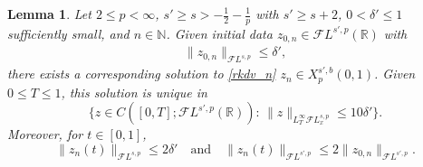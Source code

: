 \documentclass[a4paper,
11pt,  reqno]{amsart}
\newcommand{\5}{\textup{V}}
\newcommand{\FL}{\mathcal{F} L}
\newcommand{\dl}{\delta}
\newtheorem{lemma}[theorem]{Lemma}
\theoremstyle{remark}
\newcommand{\R}{\mathbb{R}}
\newcommand{\N}{\mathbb{N}}
\numberwithin{equation}{section}
\numberwithin{theorem}{section}
\begin{document}
\begin{lemma}\label{lem:zn}
Let $2 \le p < \infty$, $s' \ge s > -\frac12 - \frac1p$ with $s' \ge s+2$,  $0<\dl' \le 1$ sufficiently small, and $n\in\N$.
Given initial data $z_{0,n} \in \FL^{s',p}(\R)$ with
\begin{align}\label{z0n}
\| z_{0,n} \|_{\FL^{s, p}} \le  \dl',
\end{align}
there exists a corresponding solution to \eqref{rkdv_n} $z_n \in X^{s', b}_p(0,1)$. Given $0\le T \le 1$, this solution is unique in
$$
\big\{z\in C([0,T];\FL^{s',p}(\R)): \,  \|z\|_{L^\infty_T \FL^{s,p}_x} \le 10\delta '
\big\}.
$$
Moreover, for $t\in [0,1]$,
\begin{equation}\label{eq:bounds_zn}
	\|z_n(t)\|_{\FL^{s,p}}\le 2\dl'
\quad
\text{and}
\quad
\|z_n(t)\|_{\FL^{s',p}}\le 2\|z_{0,n}\|_{\FL^{s',p}}.
\end{equation}
\end{lemma}
\end{document}
